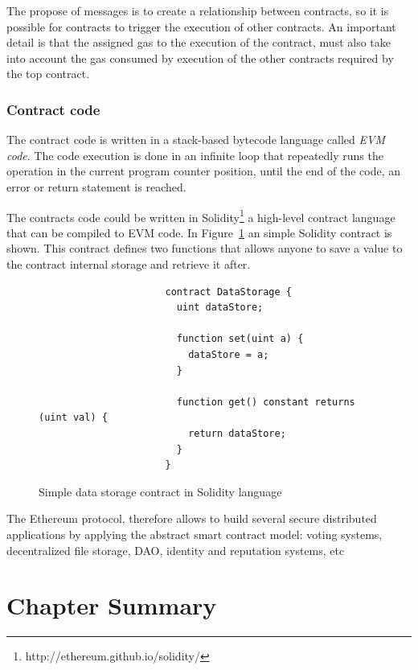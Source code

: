 The propose of messages is to create a relationship between contracts, so it is possible for contracts to trigger the execution of other contracts.
An important detail is that the assigned gas to the execution of the contract,
must also take into account the gas consumed by execution of the other contracts required by the top contract.

\subsubsection{Contract code} The contract code is written in a stack-based bytecode language called \textit{\ac{EVM} code}.
The code execution is done in an infinite loop that repeatedly runs the operation in the current program counter position, until the end of the code, an error or return statement is reached.

The contracts code could be written in Solidity\footnote{http://ethereum.github.io/solidity/} a high-level contract language that can be compiled to \ac{EVM} code.
In Figure~\ref{fig:solidity-example} an simple Solidity contract is shown.
This contract defines two functions that allows anyone to save a value to the contract internal storage and retrieve it after.

\begin{figure}[h!]
  \centering
                    \begin{Verbatim}
                      contract DataStorage {
                        uint dataStore;

                        function set(uint a) {
                          dataStore = a;
                        }

                        function get() constant returns (uint val) {
                          return dataStore;
                        }
                      }
                    \end{Verbatim}
  \caption{Simple data storage contract in Solidity language}
\label{fig:solidity-example}
\end{figure}

The Ethereum protocol, therefore allows to build several secure distributed applications by applying the abstract smart contract model: voting systems, decentralized file storage, \ac{DAO}, identity and reputation systems, etc

\section{Chapter Summary}

